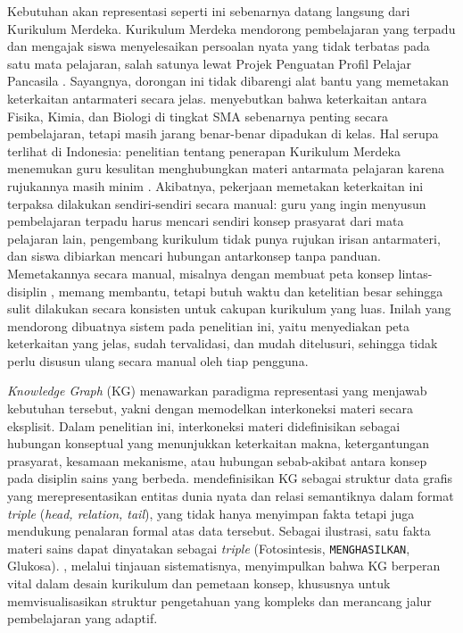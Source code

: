 \documentclass[../../thesis]{subfiles}
\begin{document}
Kebutuhan akan representasi seperti ini sebenarnya datang langsung dari Kurikulum
Merdeka. Kurikulum Merdeka mendorong pembelajaran
yang terpadu dan mengajak siswa menyelesaikan persoalan nyata yang tidak terbatas
pada satu mata pelajaran, salah satunya lewat Projek Penguatan Profil Pelajar
Pancasila \parencite{kemendikbudristek_kepmen262_2022}. Sayangnya, dorongan ini
tidak dibarengi alat bantu yang memetakan keterkaitan antarmateri secara jelas.
\textcite{dyachenko_integration_2024} menyebutkan bahwa keterkaitan antara
Fisika, Kimia, dan Biologi di tingkat SMA sebenarnya penting secara pembelajaran,
tetapi masih jarang benar-benar dipadukan di kelas. Hal serupa terlihat di
Indonesia: penelitian tentang penerapan Kurikulum Merdeka menemukan guru
kesulitan menghubungkan materi antarmata pelajaran karena rujukannya masih minim
\parencite{fransiska_fintelsia_dua_wuli_problematika_2025}. Akibatnya, pekerjaan
memetakan keterkaitan ini terpaksa dilakukan sendiri-sendiri secara manual: guru
yang ingin menyusun pembelajaran terpadu harus mencari sendiri konsep prasyarat
dari mata pelajaran lain, pengembang kurikulum tidak punya rujukan irisan
antarmateri, dan siswa dibiarkan mencari hubungan antarkonsep tanpa panduan.
Memetakannya secara manual, misalnya dengan membuat peta konsep lintas-disiplin
\parencite{semilarski_expanding_2022}, memang membantu, tetapi butuh waktu dan
ketelitian besar sehingga sulit dilakukan secara konsisten untuk cakupan
kurikulum yang luas. Inilah yang mendorong dibuatnya sistem pada penelitian ini,
yaitu menyediakan peta keterkaitan yang jelas, sudah tervalidasi, dan mudah
ditelusuri, sehingga tidak perlu disusun ulang secara manual oleh tiap pengguna.

\textit{Knowledge Graph} (KG) menawarkan paradigma representasi yang menjawab
kebutuhan tersebut, yakni dengan memodelkan interkoneksi materi secara eksplisit. Dalam penelitian ini,
interkoneksi materi didefinisikan sebagai hubungan konseptual yang menunjukkan
keterkaitan makna, ketergantungan prasyarat, kesamaan mekanisme, atau hubungan
sebab-akibat antara konsep pada disiplin sains yang berbeda. \textcite{ji_survey_2022} mendefinisikan
KG sebagai struktur data grafis yang merepresentasikan entitas dunia nyata dan
relasi semantiknya dalam format \textit{triple} (\textit{head, relation, tail}),
yang tidak hanya menyimpan fakta tetapi juga mendukung penalaran formal atas
data tersebut. Sebagai ilustrasi, satu fakta materi sains dapat dinyatakan
sebagai \textit{triple} (Fotosintesis, \texttt{MENGHASILKAN}, Glukosa).
\textcite{abu-salih_systematic_2024}, melalui tinjauan sistematisnya, menyimpulkan
bahwa KG berperan vital dalam desain kurikulum dan pemetaan konsep, khususnya untuk
memvisualisasikan struktur pengetahuan yang kompleks dan merancang jalur pembelajaran
yang adaptif.
\end{document}

